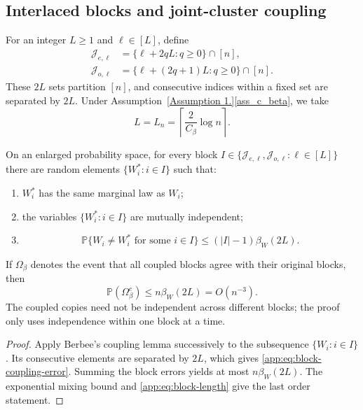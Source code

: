 \documentclass[twoside,11pt]{article}
\newenvironment{revision}{\color{revisionred}}{}
\begin{document}
\begin{revision}
\subsection{Interlaced blocks and joint-cluster coupling}

For an integer $L\ge1$ and $\ell\in[L]$, define
\begin{align}
 \mathcal J_{e,\ell}
 &=\{\ell+2qL:q\ge0\}\cap[n],                                  \label{app:eq:block-even}\\
 \mathcal J_{o,\ell}
 &=\{\ell+(2q+1)L:q\ge0\}\cap[n].                              \label{app:eq:block-odd}
\end{align}
These $2L$ sets partition $[n]$, and consecutive indices within a fixed set
are separated by $2L$.  Under Assumption~\ref{Assumption 1.}\ref{ass_c_beta},
we take
\begin{equation}
  L=L_n=\left\lceil\frac{2}{C_\beta}\log n\right\rceil.        \label{app:eq:block-length}
\end{equation}

\begin{lemma}
\label{app:lem:joint-coupling}
On an enlarged probability space, for every block
$I\in\{\mathcal J_{e,\ell},\mathcal J_{o,\ell}:\ell\in[L]\}$
there are random elements $\{W_i^*:i\in I\}$ such that:
\begin{enumerate}[label=(\roman*),leftmargin=2em]
\item $W_i^*$ has the same marginal law as $W_i$;
\item the variables $\{W_i^*:i\in I\}$ are mutually independent;
\item
\begin{equation}
 \mathbb P\{W_i\ne W_i^*\text{ for some }i\in I\}
 \le (|I|-1)\beta_W(2L).                                      \label{app:eq:block-coupling-error}
\end{equation}
\end{enumerate}
If $\Omega_\beta$ denotes the event that all coupled blocks agree with their
original blocks, then
\begin{equation}
  \mathbb P(\Omega_\beta^c)\le n\beta_W(2L)=O(n^{-3}).          \label{app:eq:total-coupling-error}
\end{equation}
The coupled copies need not be independent across different blocks; the proof
only uses independence within one block at a time.
\end{lemma}

\begin{proof}
Apply Berbee's coupling lemma successively to the subsequence
$\{W_i:i\in I\}$.  Its consecutive elements are separated by $2L$, which gives
\eqref{app:eq:block-coupling-error}.  Summing the block errors yields at most
$n\beta_W(2L)$.  The exponential mixing bound and
\eqref{app:eq:block-length} give the last order statement.
\end{proof}


\end{revision}
\end{document}

